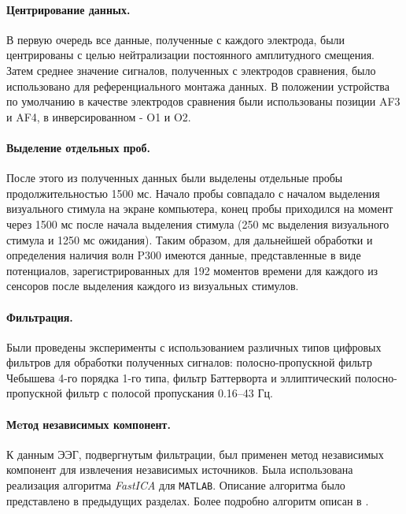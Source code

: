 \documentclass[12pt,a4paper,oneside,fleqn,leqno]{article}
\begin{document}
	\paragraph{Центрирование данных.}
	\par В первую очередь все данные, полученные с каждого электрода, были центрированы с целью нейтрализации постоянного амплитудного смещения. Затем среднее значение сигналов, полученных с электродов сравнения, было использовано для референциального монтажа данных. В положении устройства по умолчанию в качестве электродов сравнения были использованы позиции AF3 и AF4, в инверсированном - O1 и O2.
	\paragraph{Выделение отдельных проб.}
	\par После этого из полученных данных были выделены отдельные пробы продолжительностью 1500 мс. Начало пробы совпадало с началом выделения визуального стимула на экране компьютера, конец пробы приходился на момент через 1500 мс после начала выделения стимула (250 мс выделения визуального стимула и 1250 мс ожидания). Таким образом, для дальнейшей обработки и определения наличия волн P300 имеются данные, представленные в виде потенциалов, зарегистрированных для 192 моментов времени для каждого из сенсоров после выделения каждого из визуальных стимулов.
	\paragraph{Фильтрация.}
	\par Были проведены эксперименты с использованием различных типов цифровых фильтров для обработки полученных сигналов: полосно-пропускной фильтр Чебышева 4-го порядка 1-го типа, фильтр Баттерворта и эллиптический полосно-пропускной фильтр с полосой пропускания 0.16--43 Гц.
	\paragraph{Мeтод независимых компонент.}
	\par К данным ЭЭГ, подвергнутым фильтрации, был применен метод независимых компонент для извлечения независимых источников. Была использована реализация алгоритма {\it FastICA} для {\tt MATLAB}. Описание алгоритма было представлено в предыдущих разделах. Более подробно алгоритм описан в \cite{FastICA}.
\end{document}
